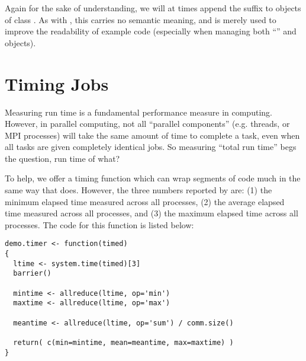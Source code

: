 Again for the sake of understanding, we will at times append the suffix  to objects of class .  As with , this carries no semantic meaning, and is merely used to improve the readability of example code (especially when managing both ``'' and  objects).


\section{Timing Jobs}

Measuring run time is a fundamental performance measure in computing.  However, in parallel computing, not all ``parallel components'' (e.g. threads, or MPI processes) will take the same amount of time to complete a task, even when all tasks are given completely identical jobs.  So measuring ``total run time'' begs the question, run time of what?

To help, we offer a timing function  which can wrap segments of code much in the same way that  does.  However, the three numbers reported by  are: (1) the minimum elapsed time measured across all processes, (2) the average elapsed time measured across all processes, and (3) the maximum elapsed time across all processes.  The code for this function is listed below:

\begin{lstlisting}[language=rr,title=Timer Function]
demo.timer <- function(timed)
{
  ltime <- system.time(timed)[3]
  barrier()
  
  mintime <- allreduce(ltime, op='min')
  maxtime <- allreduce(ltime, op='max')
  
  meantime <- allreduce(ltime, op='sum') / comm.size()
  
  return( c(min=mintime, mean=meantime, max=maxtime) )
}
\end{lstlisting}

